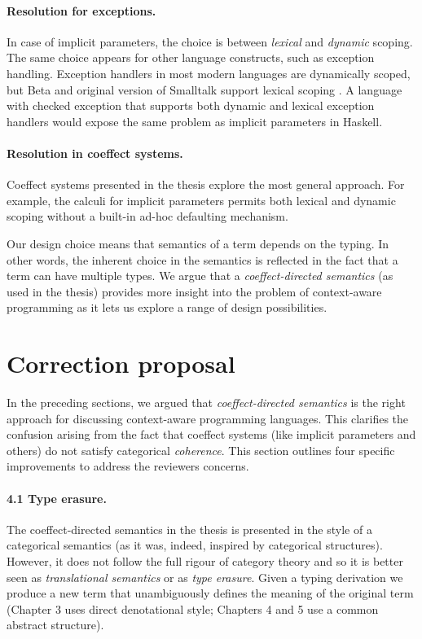\documentclass[
		twoside,openright,titlepage,numbers=noenddot,headinclude,%
                footinclude=true,cleardoublepage=empty,
                BCOR=10mm,paper=a4,fontsize=10pt, %
                ngerman,american, %
                ]{scrreprt}
\begin{document}
\paragraph{Resolution for exceptions.}
In case of implicit parameters, the choice is between \emph{lexical} and \emph{dynamic} scoping.
The same choice appears for other language constructs, such as exception handling. Exception
handlers in most modern languages are dynamically scoped, but Beta and original version of Smalltalk
support lexical scoping \cite{app-exceptions}. A language with checked exception that supports
both dynamic and lexical exception handlers would expose the same problem as implicit parameters
in Haskell.

\paragraph{Resolution in coeffect systems.}
Coeffect systems presented in the thesis explore the most general approach. For example, the
calculi for implicit parameters permits both lexical and dynamic scoping without a built-in ad-hoc
defaulting mechanism.

Our design choice means that semantics of a term depends on the typing. In other words, the
inherent choice in the semantics is reflected in the fact that a term can have multiple types.
We argue that a \emph{coeffect-directed semantics} (as used in the thesis) provides more insight
into the problem of context-aware programming as it lets us explore a range of design
possibilities.

\section{Correction proposal}
\label{sec:proposal}

In the preceding sections, we argued that \emph{coeffect-directed semantics} is the right approach
for discussing context-aware programming languages. This clarifies the confusion arising from the
fact that coeffect systems (like implicit parameters and others) do not satisfy categorical
\emph{coherence}. This section outlines four specific improvements to address the reviewers concerns.

\paragraph{4.1 Type erasure.}
The coeffect-directed semantics in the thesis is presented in the style of a categorical semantics
(as it was, indeed, inspired by categorical structures). However, it does not follow the full rigour
of category theory and so it is better seen as \emph{translational semantics} or as \emph{type
erasure}. Given a typing derivation we produce a new term that unambiguously defines the meaning of
the original term (Chapter 3 uses direct denotational style; Chapters 4 and 5 use a common
abstract structure).
\end{document}
